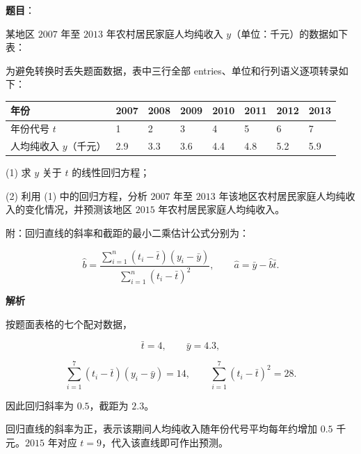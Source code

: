 \begin{answer}

\textbf{题目}：

某地区 $2007$ 年至 $2013$ 年农村居民家庭人均纯收入 $y$（单位：千元）的数据如下表：
\nopagebreak[4]
\begin{center}\end{center}
\nopagebreak[4]
为避免转换时丢失题面数据，表中三行全部 entries、单位和行列语义逐项转录如下：

\begin{center}
\begingroup\setlength{\tabcolsep}{4pt}
\begin{tabular}{llllllll}
\toprule
年份 & 2007 & 2008 & 2009 & 2010 & 2011 & 2012 & 2013 \\
\midrule
年份代号 $t$ & 1 & 2 & 3 & 4 & 5 & 6 & 7 \\
人均纯收入 $y$（千元） & 2.9 & 3.3 & 3.6 & 4.4 & 4.8 & 5.2 & 5.9 \\
\bottomrule
\end{tabular}
\endgroup
\end{center}

(1) 求 $y$ 关于 $t$ 的线性回归方程；

(2) 利用 (1) 中的回归方程，分析 $2007$ 年至 $2013$ 年该地区农村居民家庭人均纯收入的变化情况，并预测该地区 $2015$ 年农村居民家庭人均纯收入。

附：回归直线的斜率和截距的最小二乘估计公式分别为：

\nopagebreak[4]
\[
\hat b=\frac{\sum_{i=1}^n(t_i-\bar t)(y_i-\bar y)}{\sum_{i=1}^n(t_i-\bar t)^2},\qquad \hat a=\bar y-\hat b\bar t.
\]

\textbf{解析}


按题面表格的七个配对数据，

\nopagebreak[4]
\[
\bar t=4,\qquad \bar y=4.3,
\]

\nopagebreak[4]
\[
\sum_{i=1}^7(t_i-\bar t)(y_i-\bar y)=14,\qquad
\sum_{i=1}^7(t_i-\bar t)^2=28.
\]

因此回归斜率为 $0.5$，截距为 $2.3$。


回归直线的斜率为正，表示该期间人均纯收入随年份代号平均每年约增加 $0.5$ 千元。$2015$ 年对应 $t=9$，代入该直线即可作出预测。



\end{answer}
